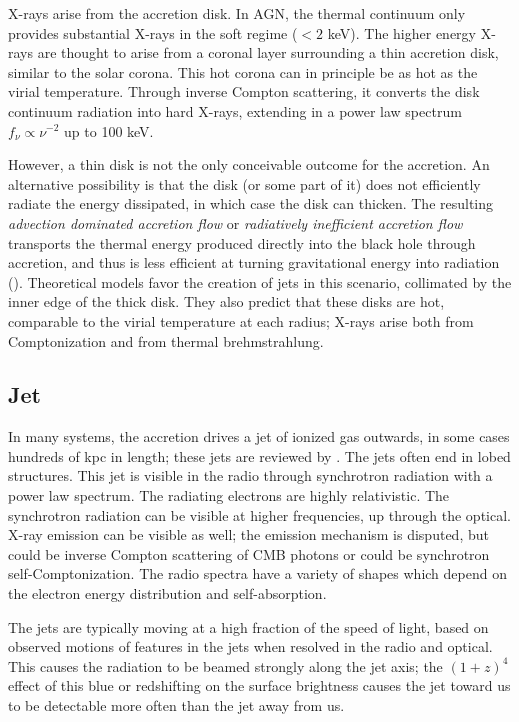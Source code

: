 X-rays arise from the accretion disk. In AGN, the thermal continuum
only provides substantial X-rays in the soft regime ($<2$ keV). The
higher energy X-rays are thought to arise from a coronal layer
surrounding a thin accretion disk, similar to the solar corona. This
hot corona can in principle be as hot as the virial
temperature. Through inverse Compton scattering, it converts the disk
continuum radiation into hard X-rays, extending in a power law
spectrum $f_\nu \propto \nu^{-2}$ up to 100 keV.

However, a thin disk is not the only conceivable outcome for the
accretion. An alternative possibility is that the disk (or some part
of it) does not efficiently radiate the energy dissipated, in which
case the disk can thicken. The resulting {\it advection dominated
accretion flow} or {\it radiatively inefficient accretion flow}
transports the thermal energy produced directly into the black hole
through accretion, and thus is less efficient at turning gravitational
energy into radiation (\citealt{narayan05a}). Theoretical models favor
the creation of jets in this scenario, collimated by the inner edge of
the thick disk. They also predict that these disks are hot, comparable
to the virial temperature at each radius; X-rays arise both from
Comptonization and from thermal brehmstrahlung.

\subsection{Jet}

In many systems, the accretion drives a jet of ionized gas outwards,
in some cases hundreds of kpc in length; these jets are reviewed
by \citet{blandford19a}.  The jets often end in lobed structures.
This jet is visible in the radio through synchrotron radiation with a
power law spectrum. The radiating electrons are highly
relativistic. The synchrotron radiation can be visible at higher
frequencies, up through the optical. X-ray emission can be visible as
well; the emission mechanism is disputed, but could be inverse Compton
scattering of CMB photons or could be synchrotron
self-Comptonization. The radio spectra have a variety of shapes
which depend on the electron energy distribution and
self-absorption.

The jets are typically moving at a high fraction of the speed of
light, based on observed motions of features in the jets when resolved
in the radio and optical. This causes the radiation to
be beamed strongly along the jet axis; the $(1+z)^4$ effect of this
blue or redshifting on the surface brightness causes the jet toward us
to be detectable more often than the jet away from us.

